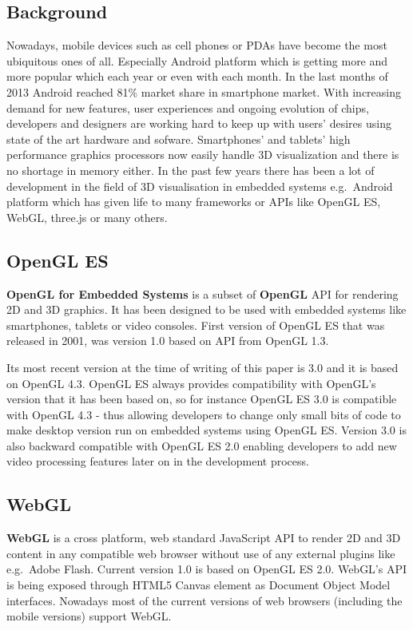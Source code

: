 
\subsection{Background}
Nowadays, mobile devices such as cell phones or PDAs have become the most ubiquitous ones of all.
Especially Android platform which is getting more and more popular which each year or even with each month.
In the last months of 2013 Android reached 81\% market share in smartphone market.
With increasing demand for new features, user experiences and ongoing evolution of chips,  developers and designers are working hard to keep up with users' desires using state of the art hardware and sofware.
Smartphones’ and tablets’ high performance graphics processors now easily handle 3D visualization and there is no shortage in memory either.
In the past few years there has been a lot of development in the field of 3D visualisation in embedded systems e.g.\ Android platform which has given life to many frameworks or APIs like OpenGL ES, WebGL, three.js or many others.

\subsection{OpenGL ES}
\textbf{OpenGL for Embedded Systems} \cite{opengles_kronos} is a subset of \textbf{OpenGL} \cite{opengl_kronos} API for rendering 2D and 3D graphics.
It has been designed to be used with embedded systems like smartphones, tablets or video consoles.
First version of OpenGL ES that was released in 2001, was version 1.0 based on API from OpenGL 1.3.

Its most recent version at the time of writing of this paper is 3.0 and it is based on OpenGL 4.3.
OpenGL ES always provides compatibility with OpenGL's version that it has been based on, so for instance OpenGL ES 3.0 is compatible with OpenGL 4.3 - thus allowing developers to change only small bits of code to make desktop version run on embedded systems using OpenGL ES.
Version 3.0 is also backward compatible with OpenGL ES 2.0 enabling developers to add new video processing features later on in the development process.

\subsection{WebGL}
\textbf{WebGL} \cite{webgl_kronos} is a cross platform, web standard JavaScript API to render 2D and 3D content in any compatible web browser without use of any external plugins like e.g.\ Adobe Flash.
Current version 1.0 is based on OpenGL ES 2.0.
WebGL's API is being exposed through HTML5 Canvas element as Document Object Model interfaces.
Nowadays most of the current versions of web browsers (including the mobile versions) support WebGL.

